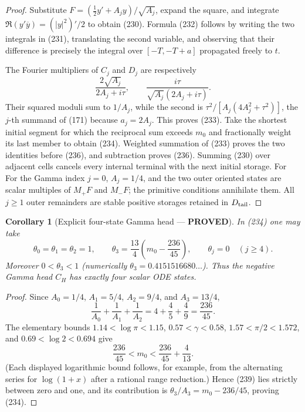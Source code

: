 \documentclass[11pt]{article}
\newtheorem{corollary}[theorem]{Corollary}
\newcommand{\PROVED}{\textcolor{green!45!black}{\textbf{PROVED}}}
\begin{document}
\begin{proof}
Substitute
$F=(\frac12y'+A_jy)/\sqrt{A_j}$, expand the square, and integrate
$\Re(y'\overline y)=(|y|^2)'/2$ to obtain (230).  Formula (232) follows by
writing the two integrals in (231), translating the second variable, and
observing that their difference is precisely the integral over
$[-T,-T+a]$ propagated freely to $t$.

The Fourier multipliers of $C_j$ and $D_j$ are respectively
\[
 \frac{2\sqrt{A_j}}{2A_j+i\tau},
 \qquad
 \frac{i\tau}{\sqrt{A_j}(2A_j+i\tau)}.
\]
Their squared moduli sum to $1/A_j$, while the second is
$\tau^2/[A_j(4A_j^2+\tau^2)]$, the $j$-th summand of (171) because
$a_j=2A_j$.  This proves (233).  Take the shortest initial segment for which
the reciprocal sum exceeds $m_0$ and fractionally weight its last member to
obtain (234).  Weighted summation of (233) proves the two identities before
(236), and subtraction proves (236).  Summing (230) over adjacent cells
cancels every internal terminal with the next initial storage.  For
For the Gamma index $j=0$, $A_{j}=1/4$, and the two outer oriented states
are scalar multiples of $M_+F$ and
$M_-F$; the primitive conditions annihilate them.  All $j\ge1$ outer
remainders are stable positive storages retained in $D_{\rm tail}$.
\end{proof}

\begin{corollary}[Explicit four-state Gamma head --- \PROVED]
In (234) one may take
\begin{equation}
 \theta_0=\theta_1=\theta_2=1,
 \qquad
 \theta_3=\frac{13}{4}
 \left(m_0-\frac{236}{45}\right),
 \qquad
 \theta_j=0\quad(j\ge4).                              \tag{239}
\end{equation}
Moreover $0<\theta_3<1$ (numerically
$\theta_3=0.4151516680\ldots$).  Thus the negative Gamma head $C_H$ has
exactly four scalar ODE states.
\end{corollary}

\begin{proof}
Since $A_0=1/4$, $A_1=5/4$, $A_2=9/4$, and $A_3=13/4$,
\[
 \frac1{A_0}+\frac1{A_1}+\frac1{A_2}
 =4+\frac45+\frac49=\frac{236}{45}.
\]
The elementary bounds
$1.14<\log\pi<1.15$, $0.57<\gamma<0.58$,
$1.57<\pi/2<1.572$, and $0.69<\log2<0.694$ give
\[
 \frac{236}{45}<m_0<\frac{236}{45}+\frac4{13}.
\]
(Each displayed logarithmic bound follows, for example, from the alternating
series for $\log(1+x)$ after a rational range reduction.)  Hence (239) lies
strictly between zero and one, and its contribution is
$\theta_3/A_3=m_0-236/45$, proving (234).
\end{proof}
\end{document}
